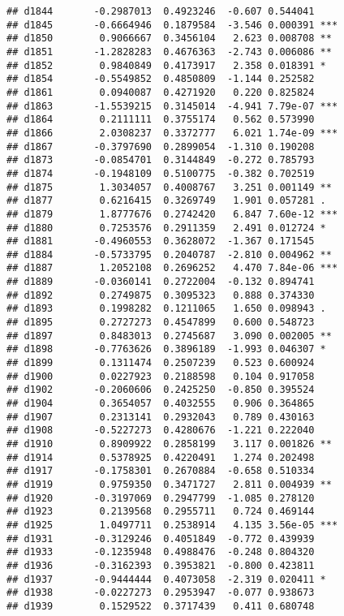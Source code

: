 \documentclass[
]{article}
\begin{document}
\begin{verbatim}
## d1844       -0.2987013  0.4923246  -0.607 0.544041    
## d1845       -0.6664946  0.1879584  -3.546 0.000391 ***
## d1850        0.9066667  0.3456104   2.623 0.008708 ** 
## d1851       -1.2828283  0.4676363  -2.743 0.006086 ** 
## d1852        0.9840849  0.4173917   2.358 0.018391 *  
## d1854       -0.5549852  0.4850809  -1.144 0.252582    
## d1861        0.0940087  0.4271920   0.220 0.825824    
## d1863       -1.5539215  0.3145014  -4.941 7.79e-07 ***
## d1864        0.2111111  0.3755174   0.562 0.573990    
## d1866        2.0308237  0.3372777   6.021 1.74e-09 ***
## d1867       -0.3797690  0.2899054  -1.310 0.190208    
## d1873       -0.0854701  0.3144849  -0.272 0.785793    
## d1874       -0.1948109  0.5100775  -0.382 0.702519    
## d1875        1.3034057  0.4008767   3.251 0.001149 ** 
## d1877        0.6216415  0.3269749   1.901 0.057281 .  
## d1879        1.8777676  0.2742420   6.847 7.60e-12 ***
## d1880        0.7253576  0.2911359   2.491 0.012724 *  
## d1881       -0.4960553  0.3628072  -1.367 0.171545    
## d1884       -0.5733795  0.2040787  -2.810 0.004962 ** 
## d1887        1.2052108  0.2696252   4.470 7.84e-06 ***
## d1889       -0.0360141  0.2722004  -0.132 0.894741    
## d1892        0.2749875  0.3095323   0.888 0.374330    
## d1893        0.1998282  0.1211065   1.650 0.098943 .  
## d1895        0.2727273  0.4547899   0.600 0.548723    
## d1897        0.8483013  0.2745687   3.090 0.002005 ** 
## d1898       -0.7763626  0.3896189  -1.993 0.046307 *  
## d1899        0.1311474  0.2507239   0.523 0.600924    
## d1900        0.0227923  0.2188598   0.104 0.917058    
## d1902       -0.2060606  0.2425250  -0.850 0.395524    
## d1904        0.3654057  0.4032555   0.906 0.364865    
## d1907        0.2313141  0.2932043   0.789 0.430163    
## d1908       -0.5227273  0.4280676  -1.221 0.222040    
## d1910        0.8909922  0.2858199   3.117 0.001826 ** 
## d1914        0.5378925  0.4220491   1.274 0.202498    
## d1917       -0.1758301  0.2670884  -0.658 0.510334    
## d1919        0.9759350  0.3471727   2.811 0.004939 ** 
## d1920       -0.3197069  0.2947799  -1.085 0.278120    
## d1923        0.2139568  0.2955711   0.724 0.469144    
## d1925        1.0497711  0.2538914   4.135 3.56e-05 ***
## d1931       -0.3129246  0.4051849  -0.772 0.439939    
## d1933       -0.1235948  0.4988476  -0.248 0.804320    
## d1936       -0.3162393  0.3953821  -0.800 0.423811    
## d1937       -0.9444444  0.4073058  -2.319 0.020411 *  
## d1938       -0.0227273  0.2953947  -0.077 0.938673    
## d1939        0.1529522  0.3717439   0.411 0.680748    

\end{verbatim}
\end{document}
